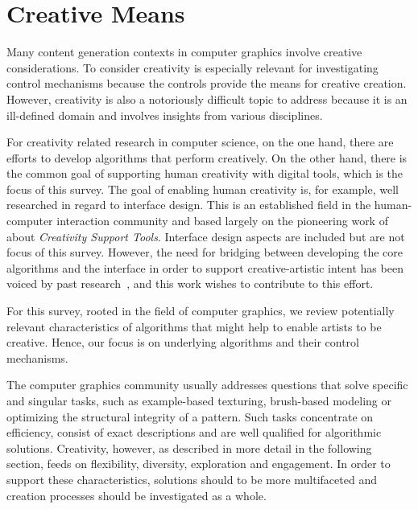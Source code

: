 

\section{Creative Means}
\label{sec:creativ_means}

Many content generation contexts in computer graphics involve creative considerations. To consider creativity is especially relevant for investigating control mechanisms because the controls provide the means for creative creation. However, creativity is also a notoriously difficult topic to address because it is an ill-defined domain and involves insights from various disciplines.


For creativity related research in computer science, on the one hand, there are efforts to develop algorithms that perform creatively. On the other hand, there is the common goal of supporting human creativity with digital tools, which is the focus of this survey. The goal of enabling human creativity is, for example, well researched in regard to interface design. This is an established field in the human-computer interaction community and based largely on the pioneering work of \citeauthor*{shneiderman_2007_cst}~\cite{shneiderman_2007_cst} about \textit{Creativity Support Tools}. Interface design aspects are included but are not focus of this survey. However, the need for bridging between developing the core algorithms and the interface in order to support creative-artistic intent has been voiced by past research~\cite{deterding_2017_mci,isenberg_2016_inw, salesin_2002_nar}, and this work wishes to contribute to this effort.

For this survey, rooted in the field of computer graphics, we review potentially relevant characteristics of algorithms that might help to enable artists to be creative. Hence, our focus is on underlying algorithms and their control mechanisms. 

The computer graphics community usually addresses questions that solve specific and singular tasks, such as example-based texturing, brush-based modeling or optimizing the structural integrity of a pattern. Such tasks concentrate on efficiency, consist of exact descriptions and are well qualified for algorithmic solutions. Creativity, however, as described in more detail in the following section, feeds on flexibility, diversity, exploration and engagement. In order to support these characteristics, solutions should to be more multifaceted and creation processes should be investigated as a whole.

